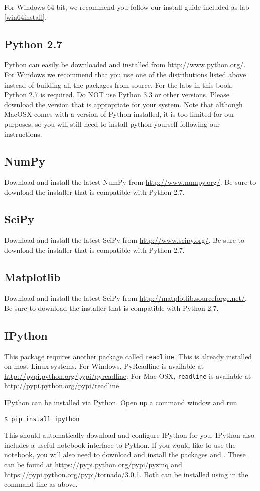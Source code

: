 For Windows 64 bit, we recommend you follow our install guide included as lab
\ref{win64install}.

\subsection*{Python 2.7}
Python can easily be downloaded and installed from \url{http://www.python.org/}.
For Windows we recommend that you use one of the distributions listed above
instead of building all the packages from source.
For the labs in this book, Python 2.7 is required.
Do NOT use Python 3.3 or other versions.
Please download the version that is appropriate for your system.
Note that although MacOSX comes with a version of Python installed, it is
too limited for our purposes, so you will still need to install python yourself
following our instructions.

\subsection*{NumPy}
Download and install the latest NumPy from \url{http://www.numpy.org/}.
Be sure to download the installer that is compatible with Python 2.7.

\subsection*{SciPy}
Download and install the latest SciPy from \url{http://www.scipy.org/}.
Be sure to download the installer that is compatible with Python 2.7.

\subsection*{Matplotlib}
Download and install the latest SciPy from \url{http://matplotlib.sourceforge.net/}.
Be sure to download the installer that is compatible with Python 2.7.

\subsection*{IPython}
This package requires another package called \texttt{readline}.
This is already installed on most Linux systems.
For Windows, PyReadline is available at \url{http://pypi.python.org/pypi/pyreadline}.
For Mac OSX, \texttt{readline} is available at
\url{http://pypi.python.org/pypi/readline}

IPython can be installed via Python.
Open up a command window and run
\begin{lstlisting}
$ pip install ipython
\end{lstlisting}
This should automatically download and configure IPython for you.
IPython also includes a useful notebook interface to Python.
If you would like to use the notebook, you will also need to download and install
the packages  and .
These can be found at \url{https://pypi.python.org/pypi/pyzmq} and
\url{https://pypi.python.org/pypi/tornado/3.0.1}.
Both can be installed using  in the command line as above.

